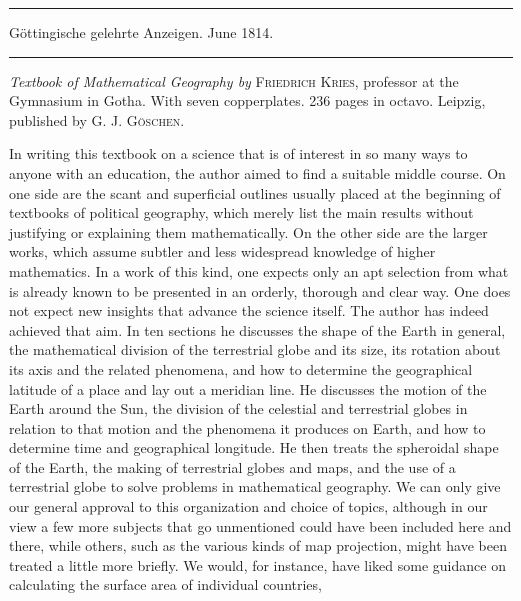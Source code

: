 \begin{center}
\rule{.85\textwidth}{.3pt}\par
Göttingische gelehrte Anzeigen. June 1814.\par
\rule{.85\textwidth}{.3pt}
\end{center}
\hspace*{\parindent}\textit{Textbook of Mathematical Geography by} \textsc{Friedrich Kries}, professor at the Gymnasium in Gotha. With seven copperplates. 236 pages in octavo. Leipzig, published by \textsc{G. J. Göschen}.

In writing this textbook on a science that is of interest in so many ways to anyone with an education, the author aimed to find a suitable middle course. On one side are the scant and superficial outlines usually placed at the beginning of textbooks of political geography, which merely list the main results without justifying or explaining them mathematically. On the other side are the larger works, which assume subtler and less widespread knowledge of higher mathematics. In a work of this kind, one expects only an apt selection from what is already known to be presented in an orderly, thorough and clear way. One does not expect new insights that advance the science itself. The author has indeed achieved that aim. In ten sections he discusses the shape of the Earth in general, the mathematical division of the terrestrial globe and its size, its rotation about its axis and the related phenomena, and how to determine the geographical latitude of a place and lay out a meridian line. He discusses the motion of the Earth around the Sun, the division of the celestial and terrestrial globes in relation to that motion and the phenomena it produces on Earth, and how to determine time and geographical longitude. He then treats the spheroidal shape of the Earth, the making of terrestrial globes and maps, and the use of a terrestrial globe to solve problems in mathematical geography. We can only give our general approval to this organization and choice of topics, although in our view a few more subjects that go unmentioned could have been included here and there, while others, such as the various kinds of map projection, might have been treated a little more briefly. We would, for instance, have liked some guidance on calculating the surface area of individual countries,
